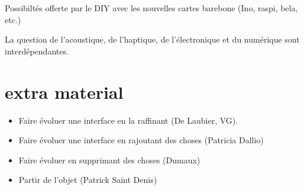 Possibiltés offerte par le DIY avec les nouvelles cartes barebone (Ino, raspi, bela, etc.)

La question de l'acoustique, de l'haptique, de l'électronique et du numérique sont interdépendantes.







\section*{extra material}

 \cite{bin_hands_2017}

\vspace{-1em}
\begin{itemize}[noitemsep]
\item Faire évoluer une interface en la raffinant (De Laubier, VG).
\item Faire évoluer une interface en rajoutant des choses (Patricia Dallio)
\item Faire évoluer en supprimant des choses (Dumaux)
\item Partir de l'objet (Patrick Saint Denis)
\end{itemize}

